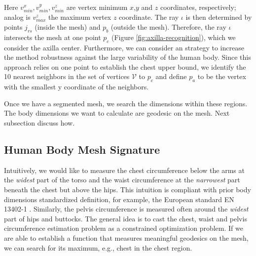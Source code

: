 \documentclass[runningheads, orivec]{llncs}
\begin{document}
Here $v^x_{min}, v^y_{min}, v^z_{min}$ are vertex minimum $x$,$y$ and $z$ 
coordinates, respectively; analog is $v^z_{max}$ the maximum vertex $z$ 
coordinate. The ray 
$\iota$ is then determined by points $j_{rs}$ (inside the mesh) and $p_b$ 
(outside the mesh). Therefore, the ray $\iota$ intersects the mesh at one point 
$p_c$ (Figure \ref{fig:axilla-recognition}), which we consider the axilla 
center. Furthermore, we can consider an strategy to increase the method 
robustness against the large variability of the human body. Since this approach 
relies on one point to establish the chest upper bound, we identify the 10 
nearest neighbors in the set of vertices $\mathcal{V}$ to $p_c$ and define 
$p_a$ to be the vertex with the smallest y coordinate of the neighbors.  

Once we have a segmented mesh, we search the dimensions within 
these regions. The body dimensions we want to calculate are 
geodesic on the mesh. Next subsection discuss how.


\subsection{Human Body Mesh Signature}\label{subsec:hbm_signature}
Intuitively, we would like to measure the chest circumference below the arms 
at the \textit{widest} part of the torso and the waist circumference at the 
\textit{narrowest} part beneath the chest but above the hips. This intuition is 
compliant 
with prior body dimensions standardized definition, for example, the European 
standard EN 13402-1 \cite{en13402-1}. Similarly, the pelvis 
circumference is measured often around the \textit{widest} part of hips and 
buttocks. The general idea is to cast the chest, waist and pelvis circumference 
estimation problem as a constrained optimization problem. If we are able to 
establish a 
function that measures meaningful geodesics on the mesh, we can search for its 
maximum, 
e.g., chest in the chest region.
\end{document}
